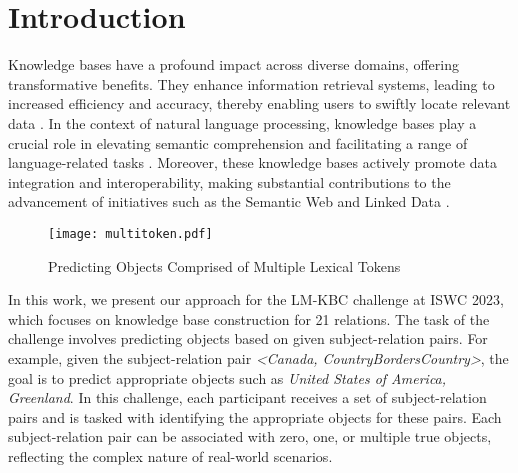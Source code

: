 \documentclass[]{ceurart}
\begin{document}
\maketitle

\section{Introduction}

Knowledge bases have a profound impact across diverse domains, offering transformative benefits. They enhance information retrieval systems, leading to increased efficiency and accuracy, thereby enabling users to swiftly locate relevant data \cite{nguyen_design_2022}. In the context of natural language processing, knowledge bases play a crucial role in elevating semantic comprehension and facilitating a range of language-related tasks \cite{zhang_dkplm_2022}. Moreover, these knowledge bases actively promote data integration and interoperability, making substantial contributions to the advancement of initiatives such as the Semantic Web and Linked Data \cite{bouaicha_semantic_2023}.
\begin{figure}
    \centering
    \texttt{[image: multitoken.pdf]}
    \caption{Predicting Objects Comprised of Multiple Lexical Tokens}
    \label{fig:multiple-token}
\end{figure}
In this work, we present our approach for the LM-KBC challenge \cite{singhania_lm-kbc_2023} at ISWC 2023, which focuses on knowledge base construction for 21 relations. The task of the challenge involves predicting objects based on given subject-relation pairs. For example, given the subject-relation pair  \textit{<Canada, CountryBordersCountry>}, the goal is to predict appropriate objects such as \textit{United States of America, Greenland}. In this challenge, each participant receives a set of subject-relation pairs and is tasked with identifying the appropriate objects for these pairs. Each subject-relation pair can be associated with zero, one, or multiple true objects, reflecting the complex nature of real-world scenarios.
\end{document}
